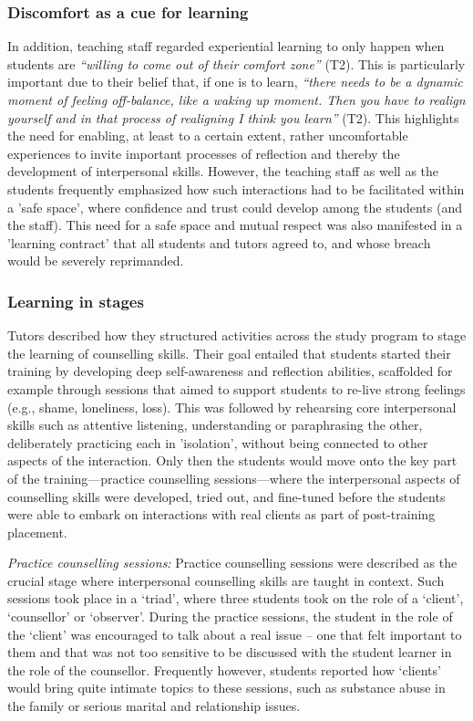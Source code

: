 \documentclass{sigchi}
\newcommand{\qq}[2]{\textrm{\textit{``#2''}}}
\begin{document}
\subsubsection{Discomfort as a cue for learning}
In addition, teaching staff regarded experiential learning to only happen when students are \qq{}{willing to come out of their comfort zone} (T2). This is particularly important due to their belief that, if one is to learn, \qq{}{there needs to be a dynamic moment of feeling off-balance, like a waking up moment. Then you have to realign yourself and in that process of realigning I think you learn} (T2). This highlights the need for enabling, at least to a certain extent, rather uncomfortable experiences to invite important processes of reflection and thereby the development of interpersonal skills. However, the teaching staff as well as the students frequently emphasized how such interactions had to be facilitated within a 'safe space', where confidence and trust could develop among the students (and the staff). This need for a safe space and mutual respect was also manifested in a 'learning contract' that all students and tutors agreed to, and whose breach would be severely reprimanded. 

\enlargethispage{\baselineskip}
\subsubsection{Learning in stages}
Tutors described how they structured activities across the study program to stage the learning of counselling skills. Their goal entailed that students started their training by developing deep self-awareness and reflection abilities, scaffolded for example through sessions that aimed to support students to re-live strong feelings (e.g., shame, loneliness, loss). This was followed by rehearsing core interpersonal skills such as attentive listening, understanding or paraphrasing the other, deliberately practicing  each in 'isolation', without being connected to other aspects of the interaction. Only then the students would move onto the key part of the training---practice counselling sessions---where the interpersonal aspects of counselling skills were developed, tried out, and fine-tuned before the students were able to embark on interactions with real clients as part of post-training placement. 

\emph{Practice counselling sessions:} \quad Practice counselling sessions were described as the crucial stage where interpersonal counselling skills are taught in context. Such sessions took place in a `triad', where three students took on the role of a `client', `counsellor' or `observer'. During the practice sessions, the student in the role of the `client' was encouraged to talk about a real issue -- one that felt important to them and that was not too sensitive to be discussed with the student learner in the role of the counsellor. Frequently however, students reported how `clients' would bring quite intimate topics to these sessions, such as substance abuse in the family or serious marital and relationship issues. 
\end{document}
